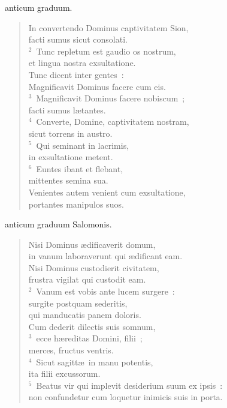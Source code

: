 \bchapter
{}anticum graduum. \begin{flushleft}\begin{verse}\vspace{6pt}In convertendo Dominus captivitatem Sion,\\ facti sumus sicut consolati.\\
${}^{2}$~Tunc repletum est gaudio os nostrum,\\ et lingua nostra exsultatione.\\ Tunc dicent inter gentes~:\\ Magnificavit Dominus facere cum eis.\\
${}^{3}$~Magnificavit Dominus facere nobiscum~;\\ facti sumus l\ae tantes.\\
${}^{4}$~Converte, Domine, captivitatem nostram,\\ sicut torrens in austro.\\
${}^{5}$~Qui seminant in lacrimis,\\ in exsultatione metent.\\
${}^{6}$~Euntes ibant et flebant,\\ mittentes semina sua.\\ Venientes autem venient cum exsultatione,\\ portantes manipulos suos.\end{verse}\end{flushleft}



\bchapter
{}anticum graduum Salomonis. \begin{flushleft}\begin{verse}\vspace{6pt}Nisi Dominus \ae dificaverit domum,\\ in vanum laboraverunt qui \ae dificant eam.\\ Nisi Dominus custodierit civitatem,\\ frustra vigilat qui custodit eam.\\
${}^{2}$~Vanum est vobis ante lucem surgere~:\\ surgite postquam sederitis,\\ qui manducatis panem doloris.\\ Cum dederit dilectis suis somnum,\\
${}^{3}$~ecce h\ae reditas Domini, filii~;\\ merces, fructus ventris.\\
${}^{4}$~Sicut sagitt\ae\ in manu potentis,\\ ita filii excussorum.\\
${}^{5}$~Beatus vir qui implevit desiderium suum ex ipsis~:\\ non confundetur cum loquetur inimicis suis in porta.\end{verse}\end{flushleft}



